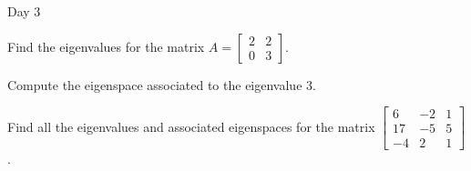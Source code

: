 \begin{applicationActivities}{Day 3}
\begin{activity}
Find the eigenvalues for the matrix $A = \begin{bmatrix} 2 & 2 \\ 0 & 3 \end{bmatrix}$.
\end{activity}

\begin{activity}
  Compute the eigenspace associated to the eigenvalue $3$.
\end{activity}

\begin{activity}
  Find all the eigenvalues and associated eigenspaces for the matrix $\begin{bmatrix} 6 & -2 & 1 \\ 17 & -5 & 5 \\ -4 & 2 & 1 \end{bmatrix}$.
\end{activity}

\end{applicationActivities}

